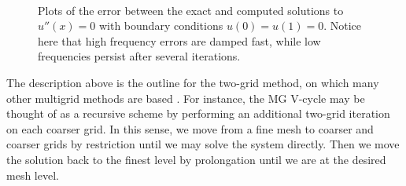 \begin{figure}
	\centering
	\\
	\caption{Plots of the error between the exact and computed solutions to $u''(x)=0$ with boundary conditions $u(0)=u(1)=0$.
			 Notice here that high frequency errors are damped fast, while low frequencies persist after several iterations.}
\end{figure}

The description above is the outline for the two-grid method, on which many other multigrid methods are based \cite{hackbusch}.
For instance, the MG V-cycle may be thought of as a recursive scheme by performing an additional two-grid iteration on each coarser grid.
In this sense, we move from a fine mesh to coarser and coarser grids by restriction until we may solve the system directly.
Then we move the solution back to the finest level by prolongation until we are at the desired mesh level. 

